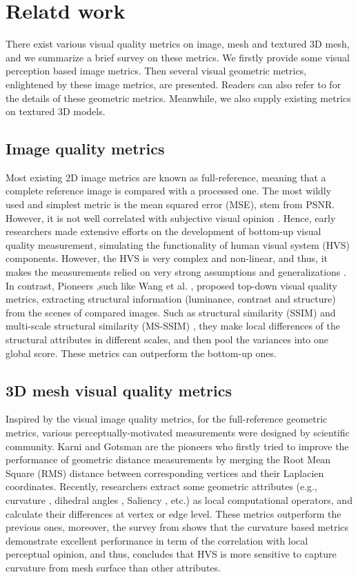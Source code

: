 \section{Relatd work}
There exist various visual quality metrics on image, mesh and textured 3D mesh, and we summarize a brief survey on these metrics. We firstly provide some visual perception based image metrics. Then several visual geometric metrics, enlightened by these image metrics, are presented. Readers can also refer to \cite{Corsini_2013} for the details of these geometric metrics.  Meanwhile, we also supply existing metrics on textured 3D models. 
\subsection{Image quality metrics}
Most existing 2D image metrics are known as full-reference, meaning that a complete reference image is compared with a processed one. The most wildly used and simplest metric is the mean squared error (MSE), stem from PSNR. However, it is not well correlated with subjective visual opinion \cite{Snyder_1985} \cite{Teo}. Hence, early researchers \cite{Mannos_1974} made extensive efforts on the development of bottom-up visual quality measurement, simulating the functionality of human visual system (HVS) components. However, the HVS is very complex and non-linear, and thus, it makes the measurements relied on very strong assumptions and generalizations \cite{Baro_1995}\cite{Xing_2002}\cite{Ramos_2001}. In contrast, Pioneers ,such like Wang et al. \cite{Wang_2004}, proposed  top-down visual quality metrics, extracting structural information (luminance, contrast and structure) from the scenes of compared images. Such as structural similarity (SSIM) \cite{Wang_2004} and multi-scale structural similarity (MS-SSIM) \cite{Zhou_Wang_2011}, they make local differences of the structural attributes in different scales, and then pool the variances into one global score. These metrics can outperform the bottom-up ones.
\subsection{3D mesh visual quality metrics}
Inspired by the visual image quality metrics, for the full-reference geometric metrics, various perceptually-motivated measurements were designed by scientific community.  Karni and Gotsman \cite{Karni_2000} are the pioneers who firstly tried to improve the performance of geometric distance measurements by merging the Root Mean Square (RMS) distance between corresponding vertices and their Laplacien coordinates. Recently, researchers extract some geometric attributes (e.g., curvature \cite{Lavou__2011}, dihedral angles \cite{V_a_2012}, Saliency \cite{Lee_2005}, etc.) as local computational operators, and calculate their differences at vertex or edge level. These metrics outperform the previous ones, moreover, the survey from \cite{Guo_2015} shows that the curvature based metrics demonstrate excellent performance  in term of the correlation with local perceptual opinion, and thus, concludes that HVS is more sensitive to capture curvature from mesh surface than other attributes.
